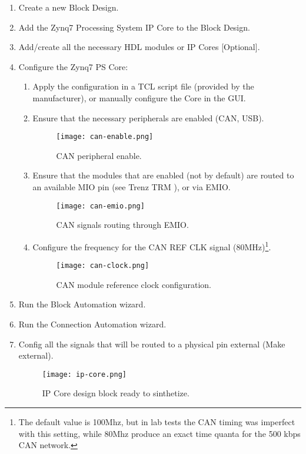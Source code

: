 \begin{enumerate}
	\item Create a new Block Design.
	\item Add the Zynq7 Processing System IP Core to the Block Design.
	\item Add/create all the necessary HDL modules or IP Cores [Optional].
	\item Configure the Zynq7 PS Core:
	\begin{enumerate}
		\item Apply the configuration in a TCL script file (provided by the manufacturer), or manually configure the Core in the GUI.
		\item Ensure that the necessary peripherals are enabled (CAN, USB).
		\begin{figure}[h!]
			\centering
			\texttt{[image: can-enable.png]}
			\caption{CAN peripheral enable.}
			\label{fig:can-enable}
		\end{figure}
		\item Ensure that the modules that are enabled (not by default) are routed to an available MIO pin (see Trenz TRM \cite{zynq-trm}), or via EMIO.
		\begin{figure}[h!]
			\centering
			\texttt{[image: can-emio.png]}
			\caption{CAN signals routing through EMIO.}
			\label{fig:can-emio}
		\end{figure}
		\item Configure the frequency for the CAN REF CLK signal (80MHz)\footnote{The default value is 100Mhz, but in lab tests the CAN timing was imperfect with this setting, while 80Mhz produce an exact time quanta for the 500 kbps CAN network.}.
		\begin{figure}[h!]
			\centering
			\texttt{[image: can-clock.png]}
			\caption{CAN module reference clock configuration.}
			\label{fig:can-clock}
		\end{figure}
	\end{enumerate}
	\item Run the Block Automation wizard.
	\item Run the Connection Automation wizard.
	\item Config all the signals that will be routed to a physical pin external (Make external).
	\begin{figure}[h!]
		\centering
		\texttt{[image: ip-core.png]}
		\caption{IP Core design block ready to sinthetize.}
		\label{fig:ip-core}
	\end{figure}

\end{enumerate}
